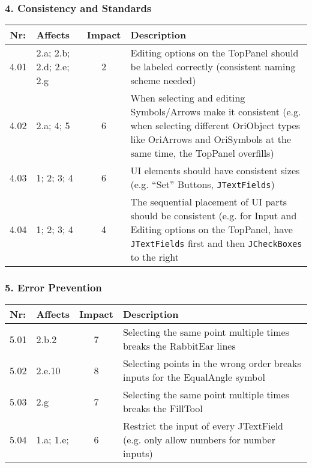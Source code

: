 \subsubsection*{4. Consistency and Standards}

        \begin{tabular}{l | p{} | c | p{}}
        Nr: & Affects & Impact & Description \\ \hline
        4.01 & 2.a; 2.b; 2.d; 2.e; 2.g  & 2 & Editing options on the TopPanel should be labeled correctly (consistent naming scheme needed)\\ \hline 
	4.02 & 2.a; 4; 5 & 6 & When selecting and editing Symbols/Arrows make it consistent (e.g. when selecting different OriObject types like OriArrows and OriSymbols at the same time, the TopPanel overfills) \\ \hline
	4.03 & 1; 2; 3; 4 & 6 & UI elements should have consistent sizes (e.g. ``Set'' Buttons, \texttt{JTextFields})\\ \hline
	4.04 & 1; 2; 3; 4 & 4 & The sequential placement of UI parts should be consistent (e.g. for Input and Editing options on the TopPanel, have \texttt{JTextFields} first and then \texttt{JCheckBoxes} to the right\\ \hline
        \end{tabular}

\subsubsection*{5. Error Prevention}

        \begin{tabular}{l | p{} | c | p{}}
        Nr: & Affects & Impact & Description \\ \hline
        5.01 & 2.b.2 & 7 & Selecting the same point multiple times breaks the RabbitEar lines \\ \hline
        5.02 & 2.e.10  & 8 & Selecting points in the wrong order breaks inputs for the EqualAngle symbol \\ \hline 
        5.03 & 2.g & 7 & Selecting the same point multiple times breaks the FillTool \\ \hline
        5.04 & 1.a; 1.e; & 6 & Restrict the input of every JTextField (e.g. only allow numbers for number inputs)\\ \hline
        \end{tabular}

